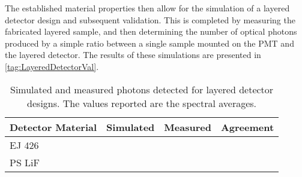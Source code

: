 The established material properties then allow for the simulation of a layered detector design and subsequent validation.
This is completed by measuring the fabricated layered sample, and then determining the number of optical photons produced by a simple ratio between a single sample mounted on the PMT and the layered detector.
The results of these simulations are presented in \autoref{tag:LayeredDetectorVal}.
\begin{table}
	\centering
	\caption[Agreement between Simulated and Measured Photons for Layered Detectors]{Simulated and measured photons detected for layered detector designs. The values reported are the spectral averages.}
	\label{tab:LayeredDetectorVal}
	\begin{tabular}{p{3cm} | p{3cm} p{3cm} p{3cm}}
	\toprule
	Detector Material & Simulated & Measured & Agreement \\
	\midrule
	EJ 426 & & & \\
	PS LiF & & & \\
	\bottomrule
	\end{tabular}
\end{table}
